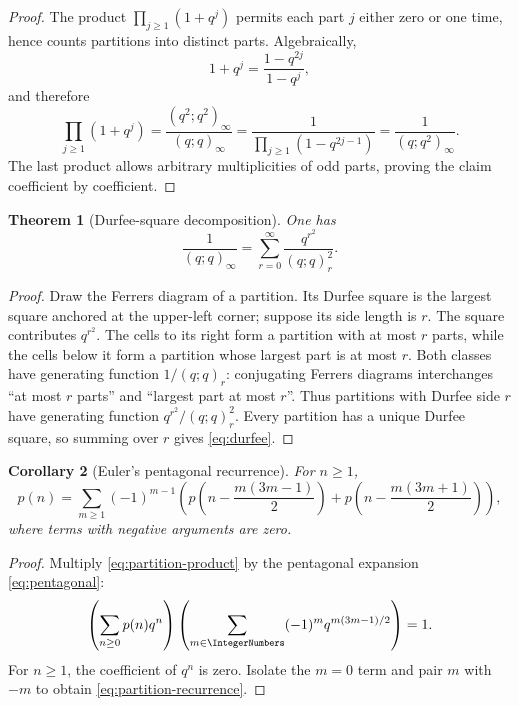 \documentclass[11pt,oneside]{article}
\newtheorem{theorem}{Theorem}[section]
\newtheorem{corollary}[theorem]{Corollary}
\theoremstyle{definition}
\begin{document}
\begin{proof}
The product $\prod_{j\ge1}(1+q^j)$ permits each part $j$ either zero or one
time, hence counts partitions into distinct parts.  Algebraically,
\[
 1+q^j=\frac{1-q^{2j}}{1-q^j},
\]
and therefore
\[
 \prod_{j\ge1}(1+q^j)
 =\frac{(q^2;q^2)_\infty}{(q;q)_\infty}
 =\frac1{\prod_{j\ge1}(1-q^{2j-1})}
 =\frac1{(q;q^2)_\infty}.
\]
The last product allows arbitrary multiplicities of odd parts, proving the
claim coefficient by coefficient.
\end{proof}

\begin{theorem}[Durfee-square decomposition]\label{thm:durfee}
One has
\begin{equation}\label{eq:durfee}
 \frac1{(q;q)_\infty}
 =\sum_{r=0}^{\infty}\frac{q^{r^2}}{(q;q)_r^2}.
\end{equation}
\end{theorem}

\begin{proof}
Draw the Ferrers diagram of a partition.  Its Durfee square is the largest
square anchored at the upper-left corner; suppose its side length is $r$.
The square contributes $q^{r^2}$.  The cells to its right form a partition
with at most $r$ parts, while the cells below it form a partition whose
largest part is at most $r$.  Both classes have generating function
$1/(q;q)_r$: conjugating Ferrers diagrams interchanges ``at most $r$ parts''
and ``largest part at most $r$''.  Thus partitions with Durfee side $r$ have
generating function $q^{r^2}/(q;q)_r^2$.  Every partition has a unique
Durfee square, so summing over $r$ gives \eqref{eq:durfee}.
\end{proof}

\begin{corollary}[Euler's pentagonal recurrence]\label{cor:partition-recurrence}
For $n\ge1$,
\begin{equation}\label{eq:partition-recurrence}
 p(n)=\sum_{m\ge1}(-1)^{m-1}
 \left(
 p\!\left(n-\frac{m(3m-1)}2\right)
 +p\!\left(n-\frac{m(3m+1)}2\right)
 \right),
\end{equation}
where terms with negative arguments are zero.
\end{corollary}

\begin{proof}
Multiply \eqref{eq:partition-product} by the pentagonal expansion
\eqref{eq:pentagonal}:
\[
 \left(\sum_{n\ge0}p(n)q^n\right)
 \left(\sum_{m\in\IntegerNumbers}(-1)^mq^{m(3m-1)/2}\right)=1.
\]
For $n\ge1$, the coefficient of $q^n$ is zero.  Isolate the $m=0$ term and
pair $m$ with $-m$ to obtain \eqref{eq:partition-recurrence}.
\end{proof}
\end{document}
